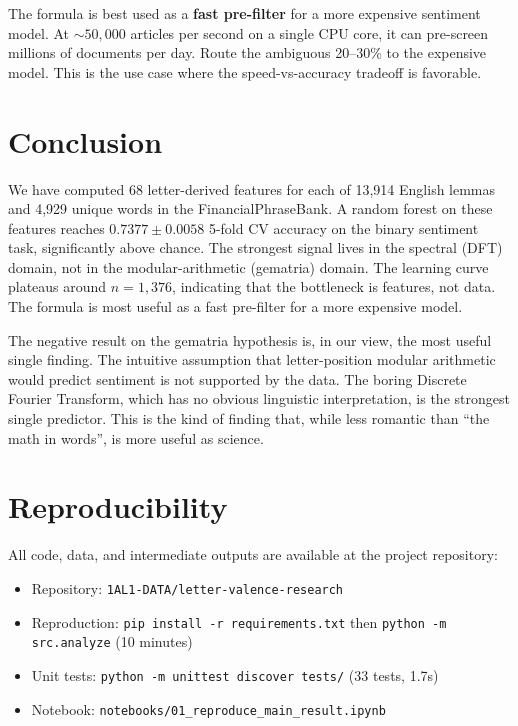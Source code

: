 \documentclass{article}
\begin{document}
The formula is best used as a \textbf{fast pre-filter} for a more expensive sentiment model. At $\sim 50{,}000$ articles per second on a single CPU core, it can pre-screen millions of documents per day. Route the ambiguous 20--30\% to the expensive model. This is the use case where the speed-vs-accuracy tradeoff is favorable.

\section{Conclusion}

We have computed 68 letter-derived features for each of 13,914 English lemmas and 4,929 unique words in the FinancialPhraseBank. A random forest on these features reaches $0.7377 \pm 0.0058$ 5-fold CV accuracy on the binary sentiment task, significantly above chance. The strongest signal lives in the spectral (DFT) domain, not in the modular-arithmetic (gematria) domain. The learning curve plateaus around $n=1{,}376$, indicating that the bottleneck is features, not data. The formula is most useful as a fast pre-filter for a more expensive model.

The negative result on the gematria hypothesis is, in our view, the most useful single finding. The intuitive assumption that letter-position modular arithmetic would predict sentiment is not supported by the data. The boring Discrete Fourier Transform, which has no obvious linguistic interpretation, is the strongest single predictor. This is the kind of finding that, while less romantic than ``the math in words'', is more useful as science.

\section*{Reproducibility}

All code, data, and intermediate outputs are available at the project repository:

\begin{itemize}
\item Repository: \texttt{1AL1-DATA/letter-valence-research}
\item Reproduction: \texttt{pip install -r requirements.txt} then \texttt{python -m src.analyze} (10 minutes)
\item Unit tests: \texttt{python -m unittest discover tests/} (33 tests, 1.7s)
\item Notebook: \texttt{notebooks/01\_reproduce\_main\_result.ipynb}
\end{itemize}
\end{document}
